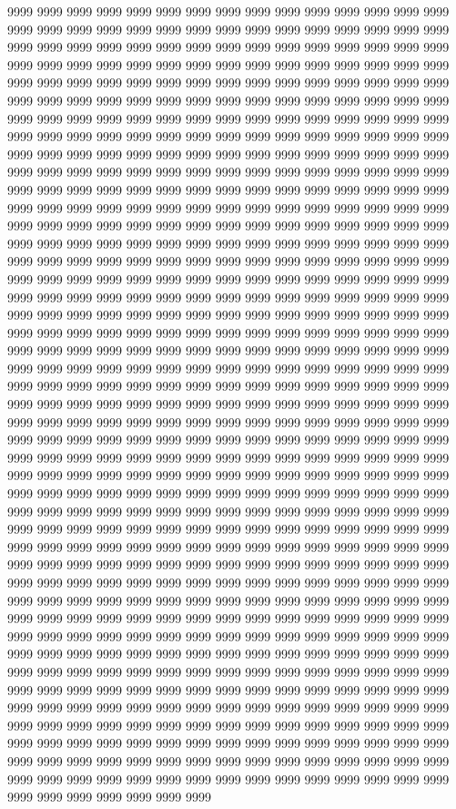 9999 9999 9999 9999 9999 9999 9999 9999 9999 9999 9999 9999 9999 9999 9999 9999 9999 9999 9999 9999 9999 9999 9999 9999 9999 9999 9999 9999 9999 9999 9999 9999 9999 9999 9999 9999 9999 9999 9999 9999 9999 9999 9999 9999 9999 9999 9999 9999 9999 9999 9999 9999 9999 9999 9999 9999 9999 9999 9999 9999 9999 9999 9999 9999 9999 9999 9999 9999 9999 9999 9999 9999 9999 9999 9999 9999 9999 9999 9999 9999 9999 9999 9999 9999 9999 9999 9999 9999 9999 9999 9999 9999 9999 9999 9999 9999 9999 9999 9999 9999 9999 9999 9999 9999 9999 9999 9999 9999 9999 9999 9999 9999 9999 9999 9999 9999 9999 9999 9999 9999 9999 9999 9999 9999 9999 9999 9999 9999 9999 9999 9999 9999 9999 9999 9999 9999 9999 9999 9999 9999 9999 9999 9999 9999 9999 9999 9999 9999 9999 9999 9999 9999 9999 9999 9999 9999 9999 9999 9999 9999 9999 9999 9999 9999 9999 9999 9999 9999 9999 9999 9999 9999 9999 9999 9999 9999 9999 9999 9999 9999 9999 9999 9999 9999 9999 9999 9999 9999 9999 9999 9999 9999 9999 9999 9999 9999 9999 9999 9999 9999 9999 9999 9999 9999 9999 9999 9999 9999 9999 9999 9999 9999 9999 9999 9999 9999 9999 9999 9999 9999 9999 9999 9999 9999 9999 9999 9999 9999 9999 9999 9999 9999 9999 9999 9999 9999 9999 9999 9999 9999 9999 9999 9999 9999 9999 9999 9999 9999 9999 9999 9999 9999 9999 9999 9999 9999 9999 9999 9999 9999 9999 9999 9999 9999 9999 9999 9999 9999 9999 9999 9999 9999 9999 9999 9999 9999 9999 9999 9999 9999 9999 9999 9999 9999 9999 9999 9999 9999 9999 9999 9999 9999 9999 9999 9999 9999 9999 9999 9999 9999 9999 9999 9999 9999 9999 9999 9999 9999 9999 9999 9999 9999 9999 9999 9999 9999 9999 9999 9999 9999 9999 9999 9999 9999 9999 9999 9999 9999 9999 9999 9999 9999 9999 9999 9999 9999 9999 9999 9999 9999 9999 9999 9999 9999 9999 9999 9999 9999 9999 9999 9999 9999 9999 9999 9999 9999 9999 9999 9999 9999 9999 9999 9999 9999 9999 9999 9999 9999 9999 9999 9999 9999 9999 9999 9999 9999 9999 9999 9999 9999 9999 9999 9999 9999 9999 9999 9999 9999 9999 9999 9999 9999 9999 9999 9999 9999 9999 9999 9999 9999 9999 9999 9999 9999 9999 9999 9999 9999 9999 9999 9999 9999 9999 9999 9999 9999 9999 9999 9999 9999 9999 9999 9999 9999 9999 9999 9999 9999 9999 9999 9999 9999 9999 9999 9999 9999 9999 9999 9999 9999 9999 9999 9999 9999 9999 9999 9999 9999 9999 9999 9999 9999 9999 9999 9999 9999 9999 9999 9999 9999 9999 9999 9999 9999 9999 9999 9999 9999 9999 9999 9999 9999 9999 9999 9999 9999 9999 9999 9999 9999 9999 9999 9999 9999 9999 9999 9999 9999 9999 9999 9999 9999 9999 9999 9999 9999 9999 9999 9999 9999 9999 9999 9999 9999 9999 9999 9999 9999 9999 9999 9999 9999 9999 9999 9999 9999 9999 9999 9999 9999 9999 9999 9999 9999 9999 9999 9999 9999 9999 9999 9999 9999 9999 9999 9999 9999 9999 9999 9999 9999 9999 9999 9999 9999 9999 9999 9999 9999 9999 9999 9999 9999 9999 9999 9999 9999 9999 9999 9999 9999 9999 9999 9999 9999 9999 9999 9999 9999 9999 9999 9999 9999 9999 9999 9999 9999 9999 9999 9999 9999 9999 9999 9999 9999 9999 9999 9999 9999 9999 9999 9999 9999 9999 9999 9999 9999 9999 9999 9999 9999 9999 9999 9999 9999 9999 9999 9999 9999 9999 9999 9999 9999 9999 9999 9999 9999 9999 9999 9999 9999 9999 9999 9999 9999 9999 9999 9999 9999 9999 9999 9999 9999 9999 9999 9999 9999 9999 9999 9999 9999 9999 9999 9999 9999 9999 9999 9999 9999 9999 9999 9999 9999 9999 9999 9999 9999 9999 9999 9999 9999 9999 9999 9999 9999 9999 9999 9999 